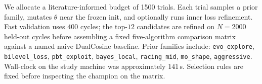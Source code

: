 We allocate a literature-informed budget of 1500 trials. Each trial samples a prior family, mutates $\theta$ near the frozen init, and optionally runs inner loss refinement. Fast validation uses $400$ cycles; the top-$12$ candidates are refined on $N=2000$ held-out cycles before assembling a fixed five-algorithm comparison matrix against a named naive DualCosine baseline. Prior families include: \texttt{evo\_explore}, \texttt{bilevel\_loss}, \texttt{pbt\_exploit}, \texttt{bayes\_local}, \texttt{racing\_mid}, \texttt{mo\_shape}, \texttt{aggressive}. Wall-clock on the study machine was approximately $141$\,s. Selection rules are fixed before inspecting the champion on the matrix.
